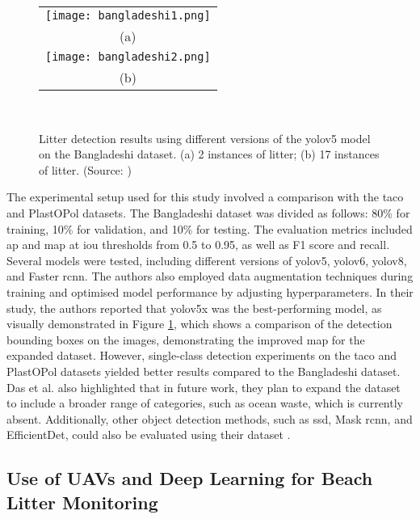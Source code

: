 \begin{figure}[!htbp]
  \centering
  \begin{tabular}{c}
    \texttt{[image: bangladeshi1.png]} \\
    \small (a)\\
    \texttt{[image: bangladeshi2.png]} \\
    \small (b) \\
  \end{tabular}\\
  \caption{Litter detection results using different versions of the \gls{yolo}v5 model on the Bangladeshi dataset. (a) 2 instances of litter; (b) 17 instances of litter. (Source: \cite{bangladeshi})}
  \label{fig:bangladeshi}
\end{figure}

The experimental setup used for this study involved a comparison with the \gls{taco} and PlastOPol datasets. The Bangladeshi dataset was divided as follows: 80\% for training, 10\% for validation, and 10\% for testing. The evaluation metrics included \gls{ap} and \gls{map} at \gls{iou} thresholds from 0.5 to 0.95, as well as F1 score and recall. Several models were tested, including different versions of \gls{yolo}v5, \gls{yolo}v6, \gls{yolo}v8, and Faster \gls{rcnn}. The authors also employed data augmentation techniques during training and optimised model performance by adjusting hyperparameters.
In their study, the authors reported that \gls{yolo}v5x was the best-performing model, as visually demonstrated in Figure \ref{fig:bangladeshi}, which shows a comparison of the detection bounding boxes on the images, demonstrating the improved \gls{map} for the expanded dataset. However, single-class detection experiments on the \gls{taco} and PlastOPol datasets yielded better results compared to the Bangladeshi dataset. Das et al. also highlighted that in future work, they plan to expand the dataset to include a broader range of categories, such as ocean waste, which is currently absent. Additionally, other object detection methods, such as \gls{ssd}, Mask \gls{rcnn}, and EfficientDet, could also be evaluated using their dataset \cite{bangladeshi}.

\subsection{Use of UAVs and Deep Learning for Beach Litter Monitoring}
\label{subsec:3_beach_litter}

